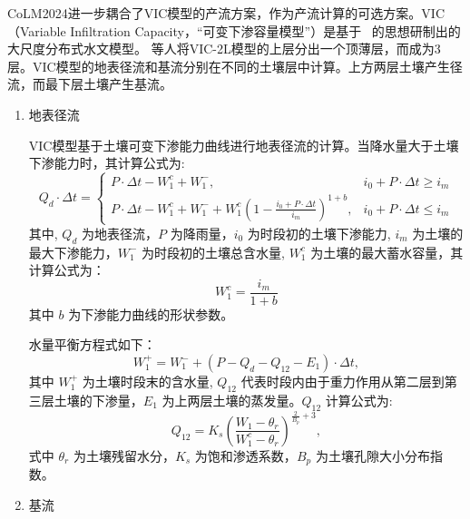 CoLM2024进一步耦合了VIC模型的产流方案，作为产流计算的可选方案。VIC（Variable Infiltration Capacity，“可变下渗容量模型”）是基于~\citet{liang1994simple} 的思想研制出的大尺度分布式水文模型。\citet{liang1994simple} 等人将VIC-2L模型的上层分出一个顶薄层，而成为3层。VIC模型的地表径流和基流分别在不同的土壤层中计算。上方两层土壤产生径流，而最下层土壤产生基流。

\begin{enumerate}
  \item 地表径流

    VIC模型基于土壤可变下渗能力曲线进行地表径流的计算。当降水量大于土壤下渗能力时，其计算公式为:
    \begin{equation}
      Q_d\cdot\Delta t=
      \begin{cases}
        P\cdot\Delta t - W_1^c + W_1^-, & i_0 + P\cdot\Delta t \geqslant i_m \\
        P\cdot\Delta t - W_1^c + W_1^- + W_1^c \left(1-\frac{i_0+P\cdot\Delta t}{i_m} \right)^{1+b}, & i_0 + P\cdot\Delta t \leqslant i_m
      \end{cases}
    \end{equation}
    其中, $Q_d$ 为地表径流，$P$ 为降雨量，$i_0$ 为时段初的土壤下渗能力, $i_m$ 为土壤的最大下渗能力，$W_1^-$ 为时段初的土壤总含水量, $W_1^c$ 为土壤的最大蓄水容量，其计算公式为：
    \begin{equation}
      W_1^c = \frac{i_m}{1+b}
    \end{equation}
    其中 $b$ 为下渗能力曲线的形状参数。

    水量平衡方程式如下：
    \begin{equation}
      W_1^+ = W_1^- + (P - Q_d - Q_{12} - E_1)\cdot\Delta t,
    \end{equation}
    其中 $W_1^+$ 为土壤时段末的含水量, $Q_{12}$ 代表时段内由于重力作用从第二层到第三层土壤的下渗量，$E_1$ 为上两层土壤的蒸发量。$Q_{12}$ 计算公式为:
    \begin{equation}
      Q_{12} = K_s \left(\frac{W_1-\theta_r}{W_1^c-\theta_r}\right)^{\frac{2}{B_p} + 3},
    \end{equation}
    式中 $\theta_r$ 为土壤残留水分，$K_s$ 为饱和渗透系数，$B_p$ 为土壤孔隙大小分布指数。

  \item 基流


\end{enumerate}
